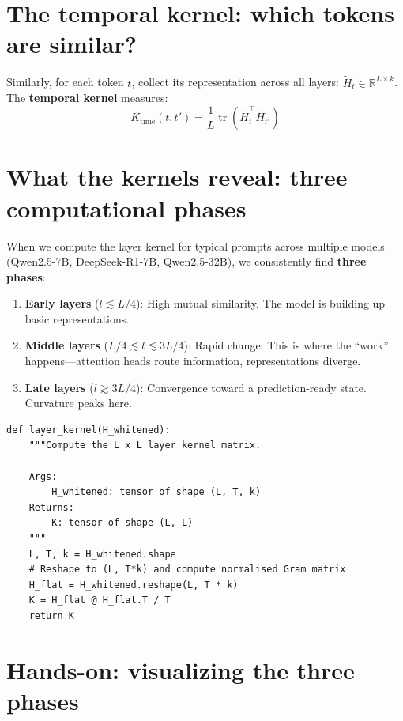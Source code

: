 \documentclass[11pt, twoside, openright]{memoir}
\begin{document}
\section{The temporal kernel: which tokens are similar?}

Similarly, for each token $t$, collect its representation across all layers:
$\widetilde{H}_t \in \mathbb{R}^{L \times k}$. The \textbf{temporal kernel}
measures:
\[
  K_{\text{time}}(t, t') = \frac{1}{L}
  \operatorname{tr}\!\left(
    \widetilde{H}_t^\top \widetilde{H}_{t'}
  \right)
\]

\section{What the kernels reveal: three computational phases}

\begin{finding}
When we compute the layer kernel for typical prompts across multiple models
(Qwen2.5-7B, DeepSeek-R1-7B, Qwen2.5-32B), we consistently find
\textbf{three phases}:

\begin{enumerate}[nosep]
\item \textbf{Early layers} ($l \lesssim L/4$): High mutual similarity.
  The model is building up basic representations.
\item \textbf{Middle layers} ($L/4 \lesssim l \lesssim 3L/4$): Rapid change.
  This is where the ``work'' happens---attention heads route
  information, representations diverge.
\item \textbf{Late layers} ($l \gtrsim 3L/4$): Convergence toward a
  prediction-ready state. Curvature peaks here.
\end{enumerate}
\end{finding}

\begin{lstlisting}[caption={Computing the layer kernel matrix}]
def layer_kernel(H_whitened):
    """Compute the L x L layer kernel matrix.

    Args:
        H_whitened: tensor of shape (L, T, k)
    Returns:
        K: tensor of shape (L, L)
    """
    L, T, k = H_whitened.shape
    # Reshape to (L, T*k) and compute normalised Gram matrix
    H_flat = H_whitened.reshape(L, T * k)
    K = H_flat @ H_flat.T / T
    return K
\end{lstlisting}

\section{Hands-on: visualizing the three phases}
\end{document}
